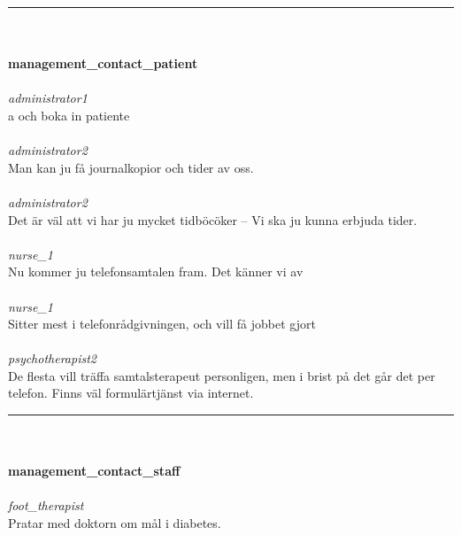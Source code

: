 \documentclass[12pt,a4paper,oneside]{article}
\begin{document}
\hrule
\ \\\ \\{\bf management\_contact\_patient }
\\\ \\%
 { \it administrator1 %
}\\
a och boka in patiente %
\ \\\ \\
 { \it   administrator2 %
}\\
Man kan ju f{\aa} journalkopior och tider av oss. %
\ \\\ \\
 { \it   administrator2 %
}\\
Det {\"a}r v{\"a}l att vi har ju mycket tidb{\"o}c{\"o}ker -- Vi ska ju kunna erbjuda tider.  %
\ \\\ \\
 { \it   nurse\_1 %
}\\
Nu kommer ju telefonsamtalen fram. Det k{\"a}nner vi av %
\ \\\ \\
 { \it   nurse\_1 %
}\\
Sitter mest i telefonr{\aa}dgivningen, och vill f{\aa} jobbet gjort %
\ \\\ \\
 { \it   psychotherapist2 %
}\\
De flesta vill tr{\"a}ffa samtalsterapeut personligen, men i brist p{\aa} det g{\aa}r det per telefon. Finns v{\"a}l formul{\"a}rtj{\"a}nst via internet.  %


\hrule
\ \\\ \\{\bf management\_contact\_staff }
\\\ \\%
 { \it foot\_therapist %
}\\
Pratar med doktorn om m{\aa}l i diabetes. %
\end{document}
